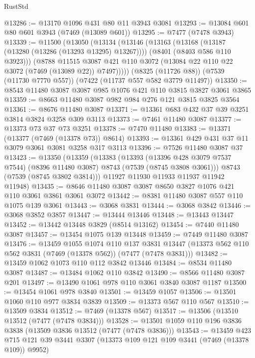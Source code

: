 \begin{lexlean}{RustStd}
\begin{coremodule}
@13286 := @13170 @1096 @431 @80 @11 @3943 @3081
@13293 := @13084 @601 @80 @601 @3943 (@7469 (@13089 @601))
@13295 := @7477 (@7478 @3943)
@13339 := @11500
    (@13050
      (@13134
        (@13146
          (@13163
            (@13168 (@13187 (@13280 (@13286 (@13293 @13295) @13267))))
            (@8401 (@8403 @586 @110 @3923)))
          (@8788
            @11515
            @3087
            @421
            @110
            @3072
            (@13084 @22 @110 @22 @3072 (@7469 (@13089 @22)) @7497)))))
    (@8325 (@11726 @88))
    (@7539 (@11730 @7770 @557))
    (@7422 (@11737 @557 @582 @3779 @11497))
@13350 := @8543 @11480 @3087 @3087 @985 @1076 @421 @110 @3815 @3827 @3061 @3865
@13359 := @8663 @11480 @3087 @982 @984 @276 @121 @3815 @3825 @3564
@13361 := @8676 @11480 @3087
@13371 := @13361 @683 @432 @37 @39 @3251 @3814 @3824 @3258 @309 @3113
@13373 := @7461 @11480 @3087
@13377 := @13373 @73 @37 @73 @3251
@13378 := @7470 @11480
@13383 := @13371 (@13377 (@7469 (@13378 @73)) @8614)
@13393 := @13361 @429 @431 @37 @11 @3079 @3061 @3081 @3258 @317 @3113
@13396 := @7526 @11480 @3087 @37
@13423 := @13350
    (@13359
      (@13383
        (@13393
          (@13396 @428 @3079 @7537 @7544)
          (@8396 @11480 @3087)
          @8743
          (@7539 (@8745 @3808 @3061)))
        @8743
        (@7539 (@8745 @3802 @3814)))
      @11927
      @11930
      @11933
      @11937
      @11942
      @11948)
@13435 := @8646 @11480 @3087 @3087 @8650 @3827 @1076 @421 @110 @3061 @3861 @3061 @3072
@13442 := @8381 @11480 @3087 @557 @110 @1075 @139 @3061
@13443 := @3068 @3831
@13444 := @3068 @3842
@13446 := @3068 @3852 @3857
@13447 := @13444 @13446
@13448 := @13443 @13447
@13452 := @13442 @13448 @3829 (@8514 @13162)
@13454 := @7440 @11480 @3087
@13457 := @13454 @1075 @139 @13448
@13459 := @7449 @11480 @3087
@13476 := @13459
    @1055
    @1074
    @110
    @137
    @3831
    @13447
    (@13373 @562 @110 @562 @3831 (@7469 (@13378 @562)) (@7477 (@7478 @3831)))
@13482 := @13459 @1062 @1073 @110 @112 @3842 @13446
@13484 := @8534 @11480 @3087
@13487 := @13484 @1062 @110 @3842
@13490 := @8566 @11480 @3087 @201
@13497 := @13490 @1061 @978 @110 @3061 @3840 @3087 @1187
@13500 := @13454 @1061 @978 @3840
@13501 := @13459 @1057
@13506 := @13501 @1060 @110 @977 @3834 @3839
@13509 := @13373 @567 @110 @567
@13510 := @13509 @3834
@13512 := @7469 (@13378 @567)
@13517 := @13506 (@13510 @13512 (@7477 (@7478 @3834)))
@13528 := @13501 @1059 @110 @196 @3836 @3838 (@13509 @3836 @13512 (@7477 (@7478 @3836)))
@13543 := @13459
    @423
    @715
    @121
    @39
    @3441
    @3307
    (@13373 @109 @121 @109 @3441 (@7469 (@13378 @109)) @9952)

\end{coremodule}
\end{lexlean}
